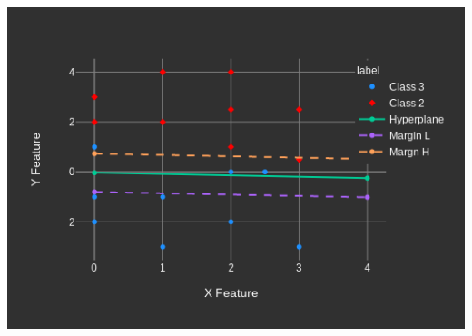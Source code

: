 \documentclass[12pt]{article}%
\begin{document}
	\includegraphics[scale=.3]{./sim3.png}
\end{document}
